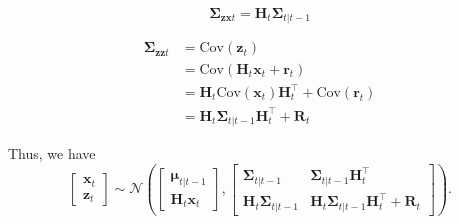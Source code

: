 \documentclass[../Bayesian_Inference.tex]{subfiles}
\begin{document}
\[
    \mathbf{\Sigma}_{\bm{z}\bm{x}t} = \mathbf{H}_t \mathbf{\Sigma}_{t | t-1}
\]

\[
\begin{aligned}
    \mathbf{\Sigma}_{\bm{z}\bm{z}t} & = \mathrm{Cov}(\bm{z}_t) \\
    & = \mathrm{Cov}(\mathbf{H}_t \bm{x}_t + \bm{r}_t) \\
    & = \mathbf{H}_t \mathrm{Cov}(\bm{x}_t) \mathbf{H}_t^{\top} + \mathrm{Cov}(\bm{r}_t) \\
    & = \mathbf{H}_t \mathbf{\Sigma}_{t | t-1} \mathbf{H}_t^{\top}  + \mathbf{R}_t
\end{aligned}
\]

Thus, we have
\[
    \begin{bmatrix}
        \bm{x}_t \\
        \bm{z}_t
    \end{bmatrix} 
    \sim 
    \mathcal{N} \left(\begin{bmatrix}
        \bm{\mu}_{t|t-1} \\
        \mathbf{H}_t \bm{x}_t
    \end{bmatrix},
    \begin{bmatrix}
        \mathbf{\Sigma}_{t | t-1} & \mathbf{\Sigma}_{t | t-1} \mathbf{H}_t^{\top} \\
        \mathbf{H}_t \mathbf{\Sigma}_{t | t-1} & \mathbf{H}_t \mathbf{\Sigma}_{t | t-1} \mathbf{H}_t^{\top}  + \mathbf{R}_t
    \end{bmatrix} 
    \right).
\]
\end{document}
